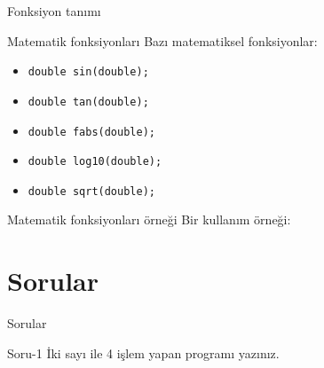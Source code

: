 \begin{frame}[fragile]{Fonksiyon tanımı}
    
\end{frame}
\begin{frame}[fragile]{Matematik fonksiyonları}
    Bazı matematiksel fonksiyonlar:
    \begin{itemize}
    \item \lstinline{double sin(double);}
    \item \lstinline{double tan(double);}
    \item \lstinline{double fabs(double);}
    \item \lstinline{double log10(double);}
    \item \lstinline{double sqrt(double);}
    \end{itemize}
\end{frame}
\begin{frame}[fragile]{Matematik fonksiyonları örneği}
    Bir kullanım örneği:
    
\end{frame}
\section{Sorular}
\begin{frame}[fragile]{Sorular}
    \begin{alertblock}{Soru-1}
        İki sayı ile 4 işlem yapan programı yazınız.
    \end{alertblock}
\end{frame}
